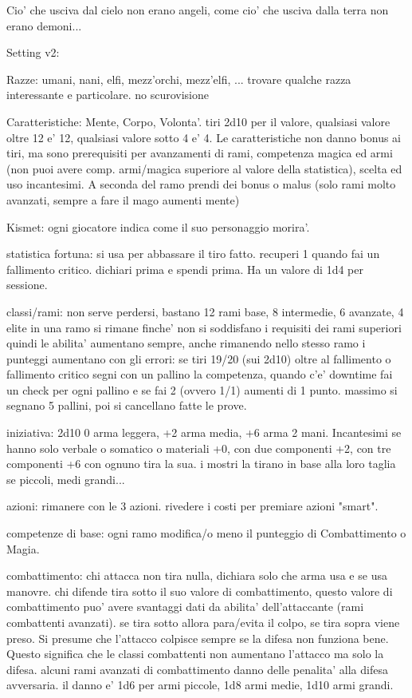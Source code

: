 \documentclass[12pt,a4paper,twoside,openany,twocolumn]{book}
\begin{document}
Cio' che usciva dal cielo non erano angeli, come cio' che usciva dalla terra non erano demoni...


Setting v2: 


Razze: umani, nani, elfi, mezz'orchi, mezz'elfi, ... trovare qualche razza interessante e particolare. no scurovisione

Caratteristiche: Mente, Corpo, Volonta'. tiri 2d10 per il valore, qualsiasi valore oltre 12 e' 12, qualsiasi valore sotto 4 e' 4.
Le caratteristiche non danno bonus ai tiri, ma sono prerequisiti per avanzamenti di rami, competenza magica ed armi (non puoi avere comp. armi/magica superiore al valore della statistica), scelta ed uso incantesimi. A seconda del ramo prendi dei bonus o malus (solo rami molto avanzati, sempre a fare il mago aumenti mente)


Kismet: ogni giocatore indica come il suo personaggio morira'.

statistica fortuna: si usa per abbassare il tiro fatto. recuperi 1 quando fai un fallimento critico. dichiari prima e spendi prima.
Ha un valore di 1d4 per sessione.

classi/rami: non serve perdersi, bastano 12 rami base, 8 intermedie, 6 avanzate, 4 elite
in una ramo si rimane finche' non si soddisfano i requisiti dei rami superiori
quindi le abilita' aumentano sempre, anche rimanendo nello stesso ramo
i punteggi aumentano con gli errori: se tiri 19/20 (sui 2d10) oltre al fallimento o fallimento critico segni con un pallino la competenza, quando c'e' downtime fai un check per ogni pallino e se fai 2 (ovvero 1/1) aumenti di 1 punto. massimo si segnano 5 pallini, poi si cancellano fatte le prove.

iniziativa: 2d10 0 arma leggera, +2 arma media, +6 arma 2 mani. Incantesimi se hanno solo verbale o somatico o materiali +0, con due componenti +2, con tre componenti +6 con ognuno tira la sua. i mostri la tirano in base alla loro taglia se piccoli, medi grandi...

azioni: rimanere con le 3 azioni. rivedere i costi per premiare azioni "smart". 

competenze di base: ogni ramo modifica/o meno il punteggio di Combattimento o Magia.

combattimento: chi attacca non tira nulla, dichiara solo che arma usa e se usa manovre. chi difende tira sotto il suo valore di combattimento, questo valore di combattimento puo' avere svantaggi dati da abilita' dell'attaccante (rami combattenti avanzati). se tira sotto allora para/evita il colpo, se tira sopra viene preso.
Si presume che l'attacco colpisce sempre se la difesa non funziona bene. Questo significa che le classi combattenti non aumentano l'attacco ma solo la difesa. alcuni rami avanzati di combattimento danno delle penalita' alla difesa avversaria.
il danno e' 1d6 per armi piccole, 1d8 armi medie, 1d10 armi grandi. 
\end{document}
